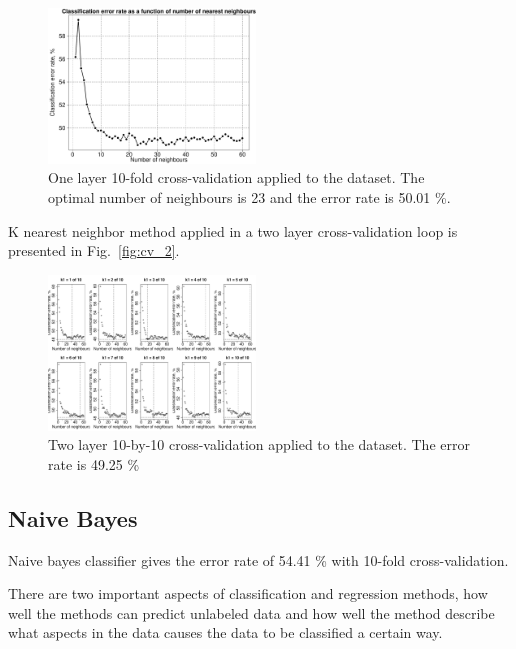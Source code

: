 \documentclass[10pt, paper=a4]{article}
\begin{document}
\begin{figure}[htbp]
  \centering
  \includegraphics[width = 0.49\textwidth]{k_nearest_neighbours_err_CV1.pdf}
  \caption{One layer 10-fold cross-validation applied to the dataset.
    The optimal number of neighbours is 23 and the error rate is 50.01
    \%.}
  \label{fig:knn_cv_1}
\end{figure}

K nearest neighbor method applied in a two layer cross-validation loop
is presented in Fig.~\ref{fig:cv_2}.

\begin{figure}[htbp]
  \centering
  \includegraphics[width = 0.49\textwidth]{k_nearest_neighbours_err_CV2.pdf}
  \caption{Two layer 10-by-10 cross-validation applied to the
    dataset. The error rate is 49.25 \%}
  \label{fig:knn_cv_2}
\end{figure}


\subsection{Naive Bayes}

Naive bayes classifier gives the error rate of 54.41 \% with 10-fold
cross-validation.

There are two important aspects of classification and regression
methods, how well the methods can predict unlabeled data and how well
the method describe what aspects in the data causes the data to be
classified a certain way.


\end{document}
